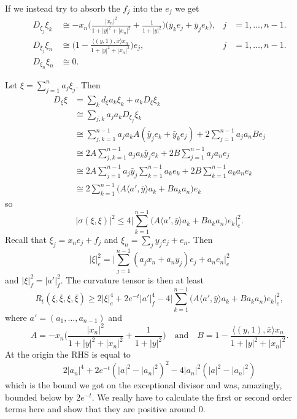 \documentclass[10pt,a4paper]{amsart}
\def\<{\langle}
\def\>{\rangle}
\def\qandq{\quad\text{and}\quad}
\def\ov#1{\overline{#1}}
\begin{document}
If we instead try to absorb the $f_j$ into the $e_j$ we get
\begin{align*}
D_{\xi_j} \xi_k
&\cong
-x_n \biggl(
\frac{|x_n|^2}{1+|y|^2+|x_n|^2}
+ \frac{1}{1+|y|^2}
\biggr)
\bigl(
\bar y_k e_j
+ \bar y_j e_k
\bigr),
& j&=1,\ldots,n-1.
\\
D_{\xi_j} \xi_n
&\cong
\biggl(1 - \frac{\<(y, 1), \bar x\> x_n}{1+|y|^2+|x_n|^2}\biggr) e_j,
& j&=1,\ldots,n-1.
\\
D_{\xi_n} \xi_n &\cong 0.
\end{align*}

Let $\xi = \sum_{j=1}^n a_j \xi_j$. Then
\begin{align*}
D_\xi \xi
&= \sum_k d_\xi a_k \xi_k + a_k D_\xi \xi_k
\\
&\cong \sum_{j,k} a_j a_k D_{\xi_j} \xi_k
\\
&\cong \sum_{j,k=1}^{n-1} a_j a_k A (\bar y_j e_k + \bar y_k e_j)
+ 2 \sum_{j=1}^{n-1} a_j a_n B e_j
\\
&\cong
2 A \sum_{j,k=1}^{n-1} a_j a_k \bar y_j e_k
+ 2 B \sum_{j=1}^{n-1} a_j a_n e_j
\\
&\cong
2 A \sum_{j=1}^{n-1} a_j \bar y_j \sum_{k=1}^{n-1} a_k e_k
+ 2 B \sum_{k=1}^{n-1} a_k a_n e_k
\\
&\cong
2
\sum_{k=1}^{n-1}
\bigl(A \<a', \bar y\> a_k + B a_k a_n \bigr) e_k
\end{align*}
so
$$
|\sigma(\xi,\xi)|^2
\leq 4 \biggl|
\sum_{k=1}^{n-1} \bigl(A \<a', \bar y\> a_k + B a_k a_n \bigr) e_k
\biggr|^2_e.
$$
Recall that $\xi_j = x_n e_j + f_j$ and $\xi_n = \sum_j y_j e_j + e_n$.
Then
$$
|\xi|^2_e
= \biggl|
\sum_{j=1}^{n-1} (a_j x_n + a_n y_j) e_j
+ a_n e_n
\biggr|^2_e
$$
and
$|\xi|^2_f = |a'|^2_f$. The curvature tensor is then at least
$$
R_t(\xi,\ov\xi,\xi,\ov\xi)
\geq 2 |\xi|_e^4
+ 2 e^{-t} |a'|^4_f
- 4\biggl|
\sum_{k=1}^{n-1} \bigl(A \<a', \bar y\> a_k + B a_k a_n \bigr) e_k
\biggr|^2_e,
$$
where $a' = (a_1, \ldots, a_{n-1})$ and
$$
A = -x_n \biggl(
\frac{|x_n|^2}{1+|y|^2+|x_n|^2}
+ \frac{1}{1+|y|^2}
\biggr)
\qandq
B = 1 - \frac{\<(y, 1), \bar x\> x_n}{1+|y|^2+|x_n|^2}.
$$
At the origin the RHS is equal to
$$
2 |a_n|^4
+ 2 e^{-t} (|a|^2-|a_n|^2)^2
- 4 |a_n|^2(|a|^2 - |a_n|^2)
$$
which is the bound we got on the exceptional divisor and was, amazingly,
bounded below by $2e^{-t}$.
We really have to calculate the first or second order terms here and show
that they are positive around $0$.
\end{document}
